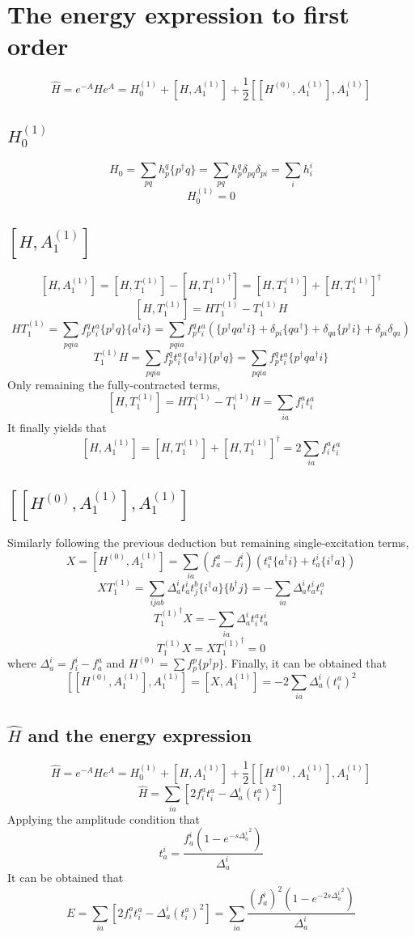 \documentclass{article}
\begin{document}
\section{The energy expression to first order}
$$\hat{H}=e^{-A}He^{A}=H_0^{(1)}+[H,A_1^{(1)}]+\frac{1}{2}[[H^{(0)},A_1^{(1)}],A_1^{(1)}]$$

\subsection{$H_0^{(1)}$}
$$H_0=\sum_{pq}h^q_p\{p^\dagger q\}=\sum_{pq}h_p^q\delta_{pq}\delta_{pi}=\sum_ih_i^i$$
$$H_0^{(1)}=0$$

\subsection{$[H,A_1^{(1)}]$}
$$[H,A_1^{(1)}]=[H,T_1^{(1)}]-[H,{T_1^{(1)}}^\dagger]=[H,T_1^{(1)}]+[H,T_1^{(1)}]^\dagger$$
$$[H,T_1^{(1)}]=HT_1^{(1)}-T_1^{(1)}H$$
$$HT_1^{(1)}=\sum_{pqia}f^q_pt^a_i\{p^\dagger q\}\{a^\dagger i\}=\sum_{pqia}f^q_pt^a_i(\{p^\dagger q a^\dagger i\}+\delta_{pi}\{qa^\dagger\}+\delta_{qa}\{p^\dagger i\}+\delta_{pi}\delta_{qa})$$
$$T_1^{(1)}H=\sum_{pqia}f^q_pt^a_i\{a^\dagger i\}\{p^\dagger q\}=\sum_{pqia}f^q_pt_i^a\{p^\dagger q a^\dagger i\}$$
\quad Only remaining the fully-contracted terms,
$$[H,T_1^{(1)}]=HT_1^{(1)}-T_1^{(1)}H=\sum_{ia}f_i^at^a_i$$
\quad It finally yields that
$$[H,A_1^{(1)}]=[H,T_1^{(1)}]+[H,T_1^{(1)}]^\dagger=2\sum_{ia}f_i^at_i^a$$

 \subsection{$[[H^{(0)},A_1^{(1)}],A_1^{(1)}]$}
 \quad Similarly following the previous deduction but remaining single-excitation terms,
 $$X=[H^{(0)},A_1^{(1)}]=\sum_{ia}(f_a^a-f_i^i)(t^a_i\{a^\dagger i\}+t_a^i\{i^\dagger a\})$$
$$ XT_1^{(1)}=\sum_{ijab}\Delta_a^it_a^it^b_j\{i^\dagger a\}\{b^\dagger j\}=-\sum_{ia}\Delta_a^it^i_at^a_i$$
$${T_1^{(1)}}^\dagger X=-\sum_{ia}\Delta_a^it_i^at_a^i$$
$$T_1^{(1)}X=X{T_1^{(1)}}^\dagger=0$$
\quad where $\Delta_a^i=f^i_i-f_a^a$ and $H^{(0)}=\sum f_p^p \{p^\dagger p\}$. Finally, it can be obtained that
 $$[[H^{(0)},A_1^{(1)}],A_1^{(1)}]=[X,A_1^{(1)}]=-2\sum_{ia}\Delta_a^i(t_i^a)^2$$
 
  \subsection{$\hat{H}$ and the energy expression}
$$\hat{H}=e^{-A}He^{A}=H_0^{(1)}+[H,A_1^{(1)}]+\frac{1}{2}[[H^{(0)},A_1^{(1)}],A_1^{(1)}]$$
$$\hat{H}=\sum_{ia}[2f^a_it^a_i-\Delta_a^i(t_i^a)^2]$$
\quad Applying the amplitude condition that
$$t_a^i=\frac{f_a^i(1-e^{-s{\Delta^i_a}^2})}{{\Delta^i_a}}$$
\quad It can be obtained that
$$E=\sum_{ia}[2f^a_it^a_i-\Delta_a^i(t_i^a)^2]=\sum_{ia}\frac{(f_a^i)^2(1-e^{-2s{\Delta^i_a}^2})}{{\Delta^i_a}}$$
\end{document}
